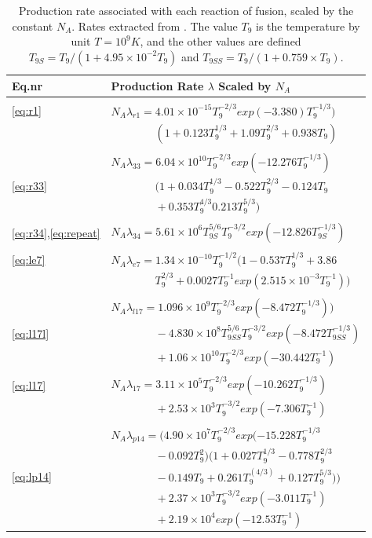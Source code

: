 \documentclass[10pt, nofootinbib, twocolumn]{revtex4-1}
\begin{document}
\newpage
\begin{table}[H]
    \centering
    \caption{Production rate associated with each reaction of fusion, scaled by the constant $N_A$. Rates extracted from \cite[p.~31]{ast}. The value $T_9$ is the temperature by unit $T=10^9K$, and the other values are defined $T_{9S}=T_9/(1+4.95\times10^{-2}T_9)$ and $T_{9SS}=T_9/(1+0.759\times T_9)$.}
    \label{tab:prod}
    \begin{tabular*}{0.5\textwidth}{@{\extracolsep{\fill}}ll}
        \toprule
        \textbf{Eq.nr} &  \textbf{Production Rate $\lambda$ Scaled by $N_A$} \\
        \hline \\
        \midrule
        \eqref{eq:r1}& $N_A\lambda_{r1}=4.01\times10^{-15}T_9^{-2/3}exp(-3.380)T_9^{-1/3})$\\
        & $\qquad\qquad(1+0.123 T_9^{1/3}+1.09T_9^{2/3}+0.938 T_9)$  \\ 
        & \\
        & $N_A\lambda_{33}=6.04\times10^{10}T_9^{-2/3}exp(-12.276T_9^{-1/3})$\\
        \eqref{eq:r33}& $\qquad\qquad(1+0.034T_9^{1/3}-0.522T_9^{2/3}-0.124T_9$\\
        & $\qquad\qquad+0.353T_9^{4/3}0.213T_9^{5/3})$\\
        & \\
        \eqref{eq:r34},\eqref{eq:repeat} & $N_A\lambda_{34}=5.61\times10^6T_{9S}^{5/6}T_9^{-3/2}exp(-12.826T_{9S}^{-1/3})$\\
        & \\
        \eqref{eq:le7} & $N_A\lambda_{e7}=1.34\times10^{-10}T_9^{-1/2}(1-0.537T_9^{1/3}+3.86$\\
        & $\qquad\qquad T_9^{2/3}+0.0027T_9^{-1}exp(2.515\times10^{-3}T_9^{-1}))$\\
        & \\
        & $N_A\lambda_{l17}=1.096\times10^9T_9^{-2/3}exp(-8.472T_9^{-1/3}))$ \\
        \eqref{eq:l17l} & $\qquad\qquad-4.830\times10^8T_{9SS}^{5/6}T_9^{-3/2}exp(-8.472T_{9SS}^{-1/3})$ \\
        & $\qquad\qquad+1.06\times10^{10}T_9^{-2/3}exp(-30.442T_9^{-1})$ \\
        & \\
        \eqref{eq:l17} & $N_A\lambda_{17}=3.11\times10^5T_9^{-2/3}exp(-10.262T_9^{-1/3})$\\
        & $\qquad\qquad+2.53\times10^3T_9^{-3/2}exp(-7.306T_9^{-1})$\\
        & \\
        & $N_A\lambda_{p14}=(4.90\times10^7T_9^{-2/3}exp(-15.228T_9^{-1/3}$ \\
        & $\qquad\qquad-0.092T_9^2)(1+0.027T_9^{1/3}-0.778T_9^{2/3}$ \\
        \eqref{eq:lp14} & $\qquad\qquad-0.149T_9+0.261T_9^{(4/3)}+0.127T_9^{5/3}))$ \\
        & $\qquad\qquad+2.37\times10^3T_9^{-3/2}exp(-3.011T_9^{-1})$ \\
        & $\qquad\qquad+2.19\times10^4exp(-12.53T_9^{-1})$ \\


\end{tabular*}
\end{table}
\end{document}
